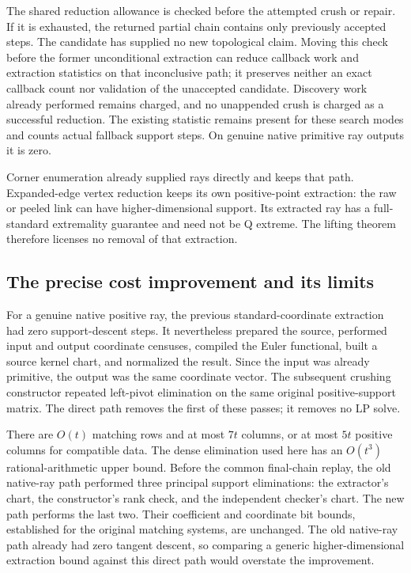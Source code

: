 The shared reduction allowance is checked before the attempted crush or
repair.  If it is exhausted, the returned partial chain contains only
previously accepted steps.  The candidate has supplied no new topological
claim.  Moving this check before the former unconditional extraction can
reduce callback work and extraction statistics on that inconclusive path;
it preserves neither an exact callback count nor validation of the
unaccepted candidate.  Discovery work already performed remains charged,
and no unappended crush is charged as a successful reduction.
The existing  statistic remains present for these
search modes and counts actual fallback support steps.  On genuine native
primitive ray outputs it is zero.

Corner enumeration already supplied rays directly and keeps that path.
Expanded-edge vertex reduction keeps its own positive-point extraction:
the raw or peeled link can have higher-dimensional support.  Its extracted
ray has a full-standard extremality guarantee and need not be Q extreme.
The lifting theorem therefore licenses no removal of that extraction.

\subsection{The precise cost improvement and its limits}

For a genuine native positive ray, the previous standard-coordinate
extraction had zero support-descent steps.  It nevertheless prepared the
source, performed input and output coordinate censuses, compiled the Euler
functional, built a source kernel chart, and normalized the result.  Since
the input was already primitive, the output was the same coordinate vector.
The subsequent crushing constructor repeated left-pivot elimination on
the same original positive-support matrix.  The direct path removes the
first of these passes; it removes no LP solve.

There are $O(t)$ matching rows and at most $7t$ columns, or at most $5t$
positive columns for compatible data.  The dense elimination used here has
an $O(t^3)$ rational-arithmetic upper bound.  Before the common final-chain
replay, the old native-ray path performed three principal support
eliminations: the extractor's chart, the constructor's rank check, and the
independent checker's chart.  The new path performs the last two.  Their
coefficient and coordinate bit bounds, established for the original
matching systems, are unchanged.  The old native-ray path already had
zero tangent descent, so comparing a generic higher-dimensional extraction
bound against this direct path would overstate the improvement.

